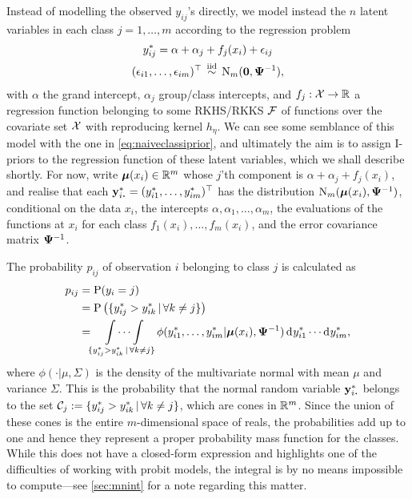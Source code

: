 Instead of modelling the observed $y_{ij}$'s directly, we model instead the $n$ latent variables in each class $j=1,\dots,m$ according to the regression problem
\begin{equation}\label{eq:multinomial-latent}
  \begin{gathered}
    y_{ij}^* = \alpha + \alpha_j + f_j(x_i) + \epsilon_{ij} \\
    (\epsilon_{i1}, \dots, \epsilon_{im})^\top  \,\overset{\text{iid}}{\sim}\, \operatorname{N}_m({\mathbf 0}, {\bm\Psi}^{-1}), 
  \end{gathered}
\end{equation}
with $\alpha$ the grand intercept, $\alpha_j$ group/class intercepts, and $f_j:{\mathcal X} \to \mathbb{R}$ a regression function belonging to some RKHS/RKKS ${\mathcal F}$ of functions over the covariate set ${\mathcal X}$ with reproducing kernel $h_\eta$.
We can see some semblance of this model with the one in \cref{eq:naiveclassiprior}, and ultimately the aim is to assign I-priors to the regression function of these latent variables, which we shall describe shortly.
For now, write ${\bm\mu}(x_i) \in \mathbb{R}^m$ whose $j$'th component is $\alpha + \alpha_j + f_j(x_i)$, and realise that each $\by_{i \bigcdot}^* = (y_{i1}^*, \dots, y_{im}^*)^\top$ has the distribution $\operatorname{N}_m({\bm\mu}(x_i), {\bm\Psi}^{-1})$, conditional on the data $x_i$,  the intercepts $\alpha,\alpha_1,\dots,\alpha_m$, the evaluations of the functions at $x_i$ for each class $f_1(x_i), \dots, f_m(x_i)$, and the error covariance matrix ${\bm\Psi}^{-1}$.

\newcommand{\intset}{\{y_{ij}^* > y_{ik}^* \,|\, \forall k \neq j\}}
The probability $p_{ij}$ of observation $i$ belonging to class $j$ is calculated as 
\begin{align}
  p_{ij} 
  &= \Prob(y_i = j) \nonumber \\
  &= \Prob\big(\intset\big) \nonumber \\
  &= \idotsint\displaylimits_{\intset} \phi(y_{i1}^*, \dots, y_{im}^*|\bmu(x_i), \bPsi^{-1}) \dint y_{i1}^* \cdots \dint y_{im}^*,\label{eq:pij}
\end{align}
where $\phi(\cdot|\mu,\Sigma)$ is the density of the multivariate normal with mean $\mu$ and variance $\Sigma$.
This is the probability that the normal random variable $\by_{i \bigcdot}^*$ belongs to the set $\cC_j := \intset$, which are cones in $\mathbb{R}^m$.
Since the union of these cones is the entire $m$-dimensional space of reals, the probabilities add up to one and hence they represent a proper probability mass function for the classes.
While this does not have a closed-form expression and highlights one of the difficulties of working with probit models, the integral is by no means impossible to compute---see \cref{sec:mnint} for a note regarding this matter.


